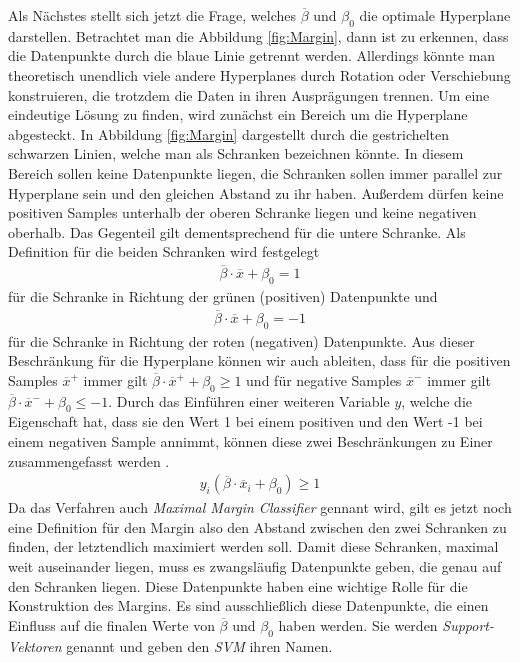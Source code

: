 \documentclass[
]{article}
\begin{document}
Als Nächstes stellt sich jetzt die Frage, welches \(\overline{\beta}\)
und \(\beta_0\) die optimale Hyperplane darstellen. Betrachtet man die
Abbildung \ref{fig:Margin}, dann ist zu erkennen, dass die Datenpunkte
durch die blaue Linie getrennt werden. Allerdings könnte man theoretisch
unendlich viele andere Hyperplanes durch Rotation oder Verschiebung
konstruieren, die trotzdem die Daten in ihren Ausprägungen trennen. Um
eine eindeutige Lösung zu finden, wird zunächst ein Bereich um die
Hyperplane abgesteckt. In Abbildung \ref{fig:Margin} dargestellt durch
die gestrichelten schwarzen Linien, welche man als Schranken bezeichnen
könnte. In diesem Bereich sollen keine Datenpunkte liegen, die Schranken
sollen immer parallel zur Hyperplane sein und den gleichen Abstand zu
ihr haben. Außerdem dürfen keine positiven Samples unterhalb der oberen
Schranke liegen und keine negativen oberhalb. Das Gegenteil gilt
dementsprechend für die untere Schranke. Als Definition für die beiden
Schranken wird festgelegt \begin{align}
\overline{\beta}\cdot \overline{x}+\beta_0=1\label{eq:posSV}
\end{align} für die Schranke in Richtung der grünen (positiven)
Datenpunkte und \begin{align}
\overline{\beta}\cdot \overline{x}+\beta_0=-1\label{eq:negSV}
\end{align} für die Schranke in Richtung der roten (negativen)
Datenpunkte. Aus dieser Beschränkung für die Hyperplane können wir auch
ableiten, dass für die positiven Samples \(\overline{x}^+\) immer gilt
\(\overline{\beta}\cdot \overline{x}^++\beta_0\ge 1\) und für negative
Samples \(\overline{x}^-\) immer gilt
\(\overline{\beta}\cdot \overline{x}^-+\beta_0\le -1\). Durch das
Einführen einer weiteren Variable \(y\), welche die Eigenschaft hat,
dass sie den Wert 1 bei einem positiven und den Wert -1 bei einem
negativen Sample annimmt, können diese zwei Beschränkungen zu Einer
zusammengefasst werden \parencite{cortesSupportvectorNetworks1995}.
\begin{align}
y_i(\overline{\beta}\cdot \overline{x}_i+\beta_0)\ge 1\label{eq:Nebenbedingung}
\end{align} Da das Verfahren auch \textit{Maximal Margin Classifier}
gennant wird, gilt es jetzt noch eine Definition für den Margin also den
Abstand zwischen den zwei Schranken zu finden, der letztendlich
maximiert werden soll. Damit diese Schranken, maximal weit auseinander
liegen, muss es zwangsläufig Datenpunkte geben, die genau auf den
Schranken liegen. Diese Datenpunkte haben eine wichtige Rolle für die
Konstruktion des Margins. Es sind ausschließlich diese Datenpunkte, die
einen Einfluss auf die finalen Werte von \(\overline{\beta}\) und
\(\beta_0\) haben werden. Sie werden \textit{Support-Vektoren} genannt
und geben den \textit{SVM} ihren Namen.
\end{document}
